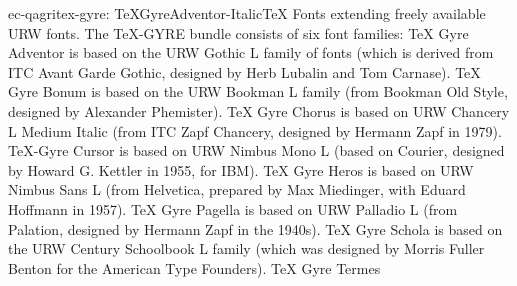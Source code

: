 \documentclass{ddltxtyp}
\begin{document}
\begin{package}{ec-qagri}{tex-gyre: TeXGyreAdventor-Italic}{{\TeX} Fonts extending freely available URW fonts.}
The {\TeX}-GYRE bundle consists of six font families: {\TeX} Gyre
Adventor is based on the URW Gothic L family of fonts (which is
derived from ITC Avant Garde Gothic, designed by Herb Lubalin
and Tom Carnase). {\TeX} Gyre Bonum is based on the URW Bookman L
family (from Bookman Old Style, designed by Alexander
Phemister). {\TeX} Gyre Chorus is based on URW Chancery L Medium
Italic (from ITC Zapf Chancery, designed by Hermann Zapf in
1979). {\TeX}-Gyre Cursor is based on URW Nimbus Mono L (based on
Courier, designed by Howard G. Kettler in 1955, for IBM). {\TeX}
Gyre Heros is based on URW Nimbus Sans L (from Helvetica,
prepared by Max Miedinger, with Eduard Hoffmann in 1957). {\TeX}
Gyre Pagella is based on URW Palladio L (from Palation,
designed by Hermann Zapf in the 1940s). {\TeX} Gyre Schola is
based on the URW Century Schoolbook L family (which was
designed by Morris Fuller Benton for the American Type
Founders). {\TeX} Gyre Termes %
\end{package}
\end{document}
